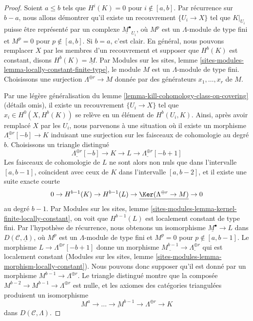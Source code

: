 \begin{proof}
Soient $a \leq b$ tels que $H^i(K) = 0$ pour $i \not \in [a, b]$. Par
récurrence sur $b - a$, nous allons démontrer qu'il existe un recouvrement
$\{U_i \to X\}$ tel que $K|_{U_i}$ puisse être représenté par un complexe
$\underline{M^\bullet}_{U_i}$, où $M^p$ est un $\Lambda$-module de type fini
et $M^p = 0$ pour $p \not \in [a, b]$. Si $b = a$, c'est clair. En général,
nous pouvons remplacer $X$ par les membres d'un recouvrement et supposer que
$H^b(K)$ est constant, disons $H^b(K) = \underline{M}$. Par Modules sur les sites,
lemme \ref{sites-modules-lemma-locally-constant-finite-type}, le module $M$
est un $\Lambda$-module de type fini. Choisissons une surjection
$\Lambda^{\oplus r} \to M$ donnée par des générateurs $x_1, \ldots, x_r$ de
$M$.

\medskip\noindent
Par une légère généralisation du lemme
\ref{lemma-kill-cohomology-class-on-covering} (détails omis), il existe un
recouvrement $\{U_i \to X\}$ tel que $x_i \in H^0(X, H^b(K))$
se relève en un élément de $H^b(U_i, K)$.
Ainsi, après avoir remplacé $X$ par les $U_i$, nous
parvenons à une situation où il existe un morphisme
$\underline{\Lambda^{\oplus r}}[-b] \to K$ induisant une surjection sur les
faisceaux de cohomologie au degré $b$. Choisissons un triangle distingué
$$
\underline{\Lambda^{\oplus r}}[-b] \to K \to L \to
\underline{\Lambda^{\oplus r}}[-b + 1]
$$
Les faisceaux de cohomologie de $L$ ne sont alors non nuls que dans
l'intervalle $[a, b - 1]$, coïncident avec ceux de $K$ dans l'intervalle
$[a, b - 2]$, et il existe une suite exacte courte
$$
0 \to H^{b - 1}(K) \to H^{b - 1}(L) \to
\underline{\Ker(\Lambda^{\oplus r} \to M)} \to 0
$$
au degré $b - 1$. Par Modules sur les sites, lemme
\ref{sites-modules-lemma-kernel-finite-locally-constant}, on voit que
$H^{b - 1}(L)$ est localement constant de type fini. Par l'hypothèse de
récurrence, nous obtenons un isomorphisme
$\underline{M^\bullet} \to L$ dans $D(\mathcal{C}, \underline{\Lambda})$,
où $M^p$ est un $\Lambda$-module de type fini et $M^p = 0$ pour
$p \not \in [a, b - 1]$. Le morphisme
$L \to \Lambda^{\oplus r}[-b + 1]$ donne un morphisme
$\underline{M^{b - 1}} \to \underline{\Lambda^{\oplus r}}$ qui est
localement constant (Modules sur les sites, lemme
\ref{sites-modules-lemma-morphism-locally-constant}). Nous pouvons donc
supposer qu'il est donné par un morphisme
$M^{b - 1} \to \Lambda^{\oplus r}$. Le triangle distingué montre que la
composée $M^{b - 2} \to M^{b - 1} \to \Lambda^{\oplus r}$ est nulle, et les
axiomes des catégories triangulées produisent un isomorphisme
$$
\underline{M^a \to \ldots \to M^{b - 1} \to \Lambda^{\oplus r}}
\longrightarrow K
$$
dans $D(\mathcal{C}, \Lambda)$.
\end{proof}

